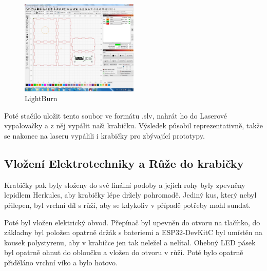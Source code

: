 
\begin{figure}[htbp]
	\centering
	\includegraphics[width=0.5\textwidth]{img/06 zakl/LightBurn_ukazka.jpg}
	\caption{LightBurn}
\end{figure}

Poté stačilo uložit tento soubor ve formátu .slv, nahrát ho do Laserové vypalovačky a z něj vypálit naši krabičku. Výsledek působil reprezentativně, takže se nakonec na laseru vypálili i krabičky pro zbývající prototypy. 


\subsection{Vložení Elektrotechniky a Růže do krabičky}
Krabičky pak byly složeny do své finální podoby a jejich rohy byly zpevněny lepidlem Herkules, aby krabičky lépe držely pohromadě. Jediný kus, který nebyl přilepen, byl vrchní díl s růží, aby se kdykoliv v případě potřeby mohl sundat. 


Poté byl vložen elektrický obvod. Přepínač byl upevněn do otvoru na tlačítko, do základny byl položen opatrně držák s bateriemi a ESP32-DevKitC byl umístěn na kousek polystyrenu, aby v krabičce jen tak neležel a nelítal. 
Ohebný LED pásek byl opatrně ohnut do obloučku a vložen do otvoru v růži. Poté bylo opatrně přiděláno vrchní víko a bylo hotovo. 

